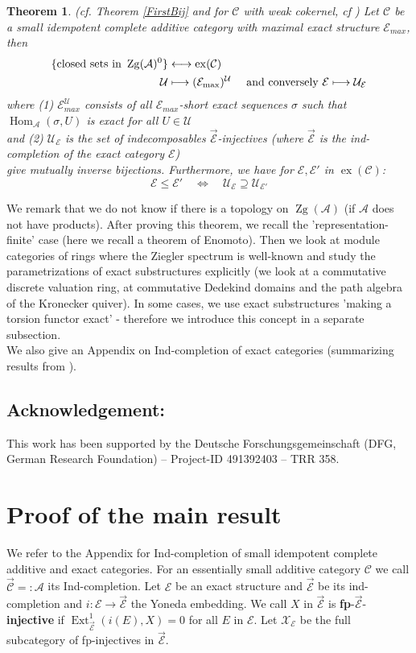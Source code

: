 \documentclass[11pt,a4paper]{amsart}
\theoremstyle{plain}
\newtheorem{thm}{Theorem}[section]
\theoremstyle{definition}
\DeclareMathOperator{\Hom}{Hom}
\DeclareMathOperator{\Ext}{Ext}
\newcommand{\mcA}{\mathcal{A}}
\newcommand{\mcC}{\mathcal{C}}
\newcommand{\mcE}{\mathcal{E}}
\newcommand{\mcU}{\mathcal{U}}
\newcommand{\mcX}{\mathcal{X}}
\DeclareMathOperator{\exact}{ex}
\DeclareMathOperator{\Zg}{Zg}
\begin{document}
\begin{thm} (cf. Theorem \ref{FirstBij} and for $\mcC$ with weak cokernel, cf \cite[Thm B]{Sch}) 
Let $\mcC$ be a small idempotent complete additive category with maximal exact structure $\mcE_{max}$, then  
\[
\begin{aligned}
\{ \text{closed sets in } \Zg (\mcA)^0\} & \longleftrightarrow \exact (\mcC)\\
\mcU &\longmapsto (\mcE_{\rm max})^{\mcU} \quad \text{ and conversely } \mcE\longmapsto \mcU_{\mcE}\end{aligned}
\]
where (1) $\mcE_{max}^{\mcU}$ consists of all $\mcE_{max}$-short exact sequences $\sigma$ such that $\Hom_{\mcA} (\sigma , U)$ is exact for all $U \in \mcU$\\
and (2) $\mcU_{\mcE}$ is the set of indecomposables $\overrightarrow{\mcE}$-injectives (where $\overrightarrow{\mcE}$ is the ind-completion of the exact category $\mcE$)\\
give mutually inverse bijections. Furthermore, we have for $\mcE, \mcE' $ in $\exact (\mcC)$: 
\[
\mcE\leq \mcE' \quad \Leftrightarrow \quad \mcU_{\mcE} \supseteq \mcU_{\mcE'}
\]
\end{thm}

We remark that we do not know if there is a topology on $\Zg(\mcA)$ (if $\mcA$ does not have products). 
After proving this theorem, we recall the 'representation-finite' case (here we recall a theorem of Enomoto). Then we look at module categories of rings where the Ziegler spectrum is well-known and study the parametrizations of exact substructures explicitly (we look at a commutative discrete valuation ring, at commutative Dedekind domains and the path algebra of the Kronecker quiver). In some cases, we use exact substructures 'making a torsion functor exact' - therefore we introduce this concept in a separate subsection. \\
We also give an Appendix on Ind-completion of exact categories (summarizing results from \cite{P-locCoh}). 

\subsection*{Acknowledgement:}
This work has been supported by the Deutsche Forschungsgemeinschaft (DFG, German Research Foundation) -- Project-ID 491392403 -- TRR 358.  


\section{Proof of the main result}
We refer to the Appendix for Ind-completion of small idempotent complete additive and exact categories. For an essentially small additive category $\mcC$ we call $\overrightarrow{\mcC}=:\mcA$ its Ind-completion. 
Let $\mcE$ be an exact structure and $\overrightarrow{\mcE}$ be its ind-completion and $i \colon \mcE \to \overrightarrow{\mcE}$ the Yoneda embedding. We call $X$ in $\overrightarrow{\mcE}$ is \textbf{fp}-$\overrightarrow{\mcE}$-\textbf{injective} if $\Ext^1_{\overrightarrow{\mcE}} (i(E), X)=0$ for all $E$ in $\mcE$. Let $\mcX_{\mcE}$ be the full subcategory of fp-injectives in $\overrightarrow{\mcE}$. 
\end{document}
